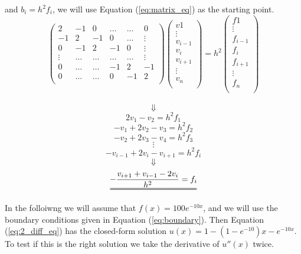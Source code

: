\documentclass[12pt]{article}
\begin{document}
\begin{flushleft}
and $b_i=h^2f_i$, we will use Equation (\ref{eq:matrix_eq}) as the starting point.\\
\vspace{5mm}
$$\left(\begin{array}{cccccc}
    2& -1& 0 &\dots   & \dots &0 \\
    -1 & 2 & -1 &0 &\dots &\vdots \\
     0&-1 &2 & -1 & 0 & \vdots \\
     \vdots & \dots   & \dots &\dots   &\dots & \vdots \\
     0&\dots   &\dots  &-1 &2& -1 \\
     0&\dots    &\dots  & 0  &-1 & 2 \\
    \end{array} \right)    
    \left(\begin{array}{c}
    v{1}\\
    \vdots \\
     v_{i-1}\\
     v_{i}\\
     v_{i+1}\\
     \vdots \\
     v_{n}\\
    \end{array} \right)=
    h^{2}\left(\begin{array}{c}
    f{1}\\
    \vdots \\
     f_{i-1}\\
     f_{i}\\
     f_{i+1}\\
     \vdots \\
     f_{n}\\
    \end{array} \right)$$\\
    
$$\Downarrow$$
$$2v_{1}-v_{2} = h^{2}f_{1}$$
$$-v_{1}+2v_{2}-v_{3} = h^{2}f_{2}$$
$$-v_{2}+2v_{3}-v_{4} = h^{2}f_{3}$$
$$\vdots$$
$$-v_{i-1}+2v_{i}-v_{i+1} = h^{2}f_{i}$$
$$\Downarrow$$
$$\uuline{-\frac{v_{i+1}+v_{i-1}-2v_{i}}{h^{2}} = f_{i}}$$

\newpage
In the folloiwng we will assume that $f(x) = 100e^{-10x}$, and we will use the boundary conditions given in Equation (\ref{eq:boundary}). Then Equation (\ref{eq:2_diff_eq}) has the closed-form solution $u(x) = 1-(1-e^{-10})x-e^{-10x}$. To test if this is the right solution we take the derivative of $u''(x)$ twice.\\


\end{flushleft}
\end{document}
